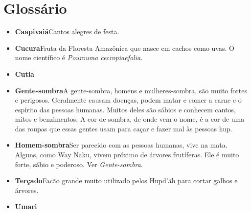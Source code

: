 \blankpage
{}
\chapter{Glossário}

\begin{itemize}
\item{\formular\textbf{Caapivaiá}}\quad Cantos alegres de festa.\smallskip
\item{\formular\textbf{Cucura}}\quad Fruta da Floresta Amazônica que nasce em cachos
como uvas. O nome científico é \textit{Pourouma cecropiaefolia}.\smallskip
\item{\formular\textbf{Cutia}}\quad {}\smallskip
\item{\formular\textbf{Gente-sombra}}\quad A gente-sombra, homens e mulheres-sombra, são
muito fortes e perigosos. Geralmente causam doenças, podem matar
e comer a carne e o espírito das pessoas humanas. Muitos deles
são sábios e conhecem cantos, mitos e benzimentos. A cor de
sombra, de onde vem o nome, é a cor de uma das roupas que essas gentes
usam para caçar e fazer mal às pessoas hup.\smallskip
\item{\formular\textbf{Homem-sombra}}\quad Ser parecido com as pessoas
humanas, vive na mata. Alguns, como Way Naku, vivem próximo de árvores frutíferas. Ele
é muito forte, sábio e poderoso. Ver \textit{Gente-sombra}.\smallskip
\item{\formular\textbf{Terçado}}\quad Facão grande muito utilizado pelos Hupd’äh para cortar
galhos e árvores.\smallskip
\item{\formular\textbf{Umari}}\quad {}
\end{itemize}

